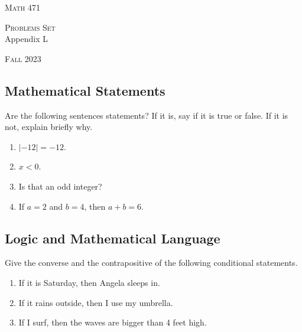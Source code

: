 


\hrulefill

\begin{minipage}{0.33\textwidth}
\textsc{Math 471}
\end{minipage} \hfill 
\begin{minipage}{0.32\textwidth}
\centering
\textsc{Problems Set} \\
Appendix L
\end{minipage}
 \hfill 
 \begin{minipage}{0.33\textwidth}
 \flushright \textsc{Fall 2023}
 \end{minipage}

\hrulefill

\setcounter{section}{12}

 \subsection[~~Mathematical Statements]{Mathematical Statements}

 \begin{problem}
 Are the following sentences statements? If it is, say if it is true or false. If it is not, explain briefly why.
 	\begin{enumerate}[label=\alph*)]
 	\item $|-12| = -12$.
 	\item $x < 0$.
 	\item Is that an odd integer?
 	\item If $a= 2$ and $b = 4$, then $a + b = 6$.
 	\end{enumerate}
 \end{problem}

 \subsection[~~Logic and Mathematical Language]{Logic and Mathematical Language}

 \begin{problem}
Give the converse and the contrapositive of the following conditional statements.
 	\begin{enumerate}[label=\alph*)]
 		\item If it is Saturday, then Angela sleeps in.
 		\item If it rains outside, then I use my umbrella.
 		\item If I surf, then the waves are bigger than 4 feet high.
 	\end{enumerate}
 \end{problem}

